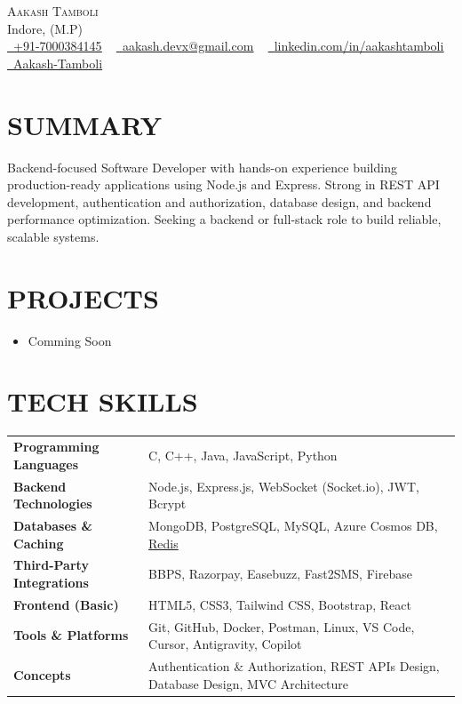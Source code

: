\documentclass[letterpaper,11pt]{article}
\newcommand{\resumeItem}[1]{\item\small{{#1 \vspace{-2pt}}}}
\newcommand{\resumeSubHeadingListStart}{\begin{itemize}[leftmargin=0.0in, label={}]}
\newcommand{\resumeSubHeadingListEnd}{\end{itemize}}
\begin{document}
\begin{center}
  {\Huge \scshape Aakash Tamboli} \\ \vspace{1pt}
  Indore, (M.P) \\ \vspace{1pt}
  \small
  \href{tel:+7000384145}{\faPhone\ \underline{+91-7000384145}} ~
  \href{mailto:aakash.devx@gmail.com}{\faEnvelope\ \underline{aakash.devx@gmail.com}} ~
  \href{https://www.linkedin.com/in/aakashtamboli/}{\faLinkedin\ \underline{linkedin.com/in/aakashtamboli}} ~
  \href{https://github.com/Aakash-Tamboli}{\faGithub\ \underline{Aakash-Tamboli}}
\end{center}

\section{SUMMARY}
Backend-focused Software Developer with hands-on experience building production-ready applications using Node.js and Express. Strong in REST API development, authentication and authorization, database design, and backend performance optimization. Seeking a backend or full-stack role to build reliable, scalable systems.



\section{PROJECTS}
\resumeSubHeadingListStart
\resumeItem{Comming Soon}
\resumeSubHeadingListEnd




\section{TECH SKILLS}
\begin{tabularx}{\textwidth}{l @{\hspace{3em}} X}
  \textbf{Programming Languages} & C, C++, Java, JavaScript, Python \\
  \textbf{Backend Technologies} & Node.js, Express.js, WebSocket (Socket.io), JWT, Bcrypt \\
  \textbf{Databases \& Caching} & MongoDB, PostgreSQL, MySQL, Azure Cosmos DB, \href{https://youtu.be/Vx2zPMPvmug}{Redis} \\
  \textbf{Third-Party Integrations} & BBPS, Razorpay, Easebuzz, Fast2SMS, Firebase \\
  \textbf{Frontend (Basic)} & HTML5, CSS3, Tailwind CSS, Bootstrap, React \\
  \textbf{Tools \& Platforms} & Git, GitHub, Docker, Postman, Linux, VS Code, Cursor, Antigravity, Copilot \\
  \textbf{Concepts} & Authentication \& Authorization, REST APIs Design, Database Design, MVC Architecture
\end{tabularx}
\end{document}
